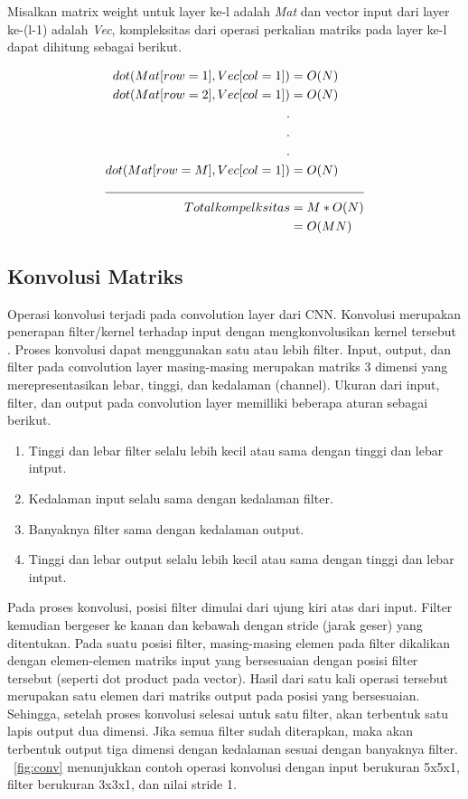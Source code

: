 Misalkan matrix weight untuk layer ke-l adalah \textit{Mat} dan vector input dari layer ke-(l-1) adalah \textit{Vec}, kompleksitas dari operasi perkalian matriks pada layer ke-l dapat dihitung sebagai berikut.

\noindent \begin{align}\label{eq:mamulcomplexity} \nonumber
	dot(Mat[row=1], Vec[col=1]) &= O(N) \\ \nonumber
	dot(Mat[row=2], Vec[col=1]) &= O(N) \\ \nonumber
	.\\ \nonumber
	.\\ \nonumber
	.\\ \nonumber
	dot(Mat[row=M], Vec[col=1]) &= O(N) \\ 
	\cline{1-2}
	\nonumber Total kompelksitas &= M*O(N) \\ 
	 &= O(MN)
\end{align} 

\subsection{Konvolusi Matriks}
Operasi konvolusi terjadi pada convolution layer dari CNN. Konvolusi merupakan penerapan filter/kernel terhadap input dengan mengkonvolusikan kernel tersebut \cite{deeplearningmatrix}. Proses konvolusi dapat menggunakan satu atau lebih filter. Input, output, dan filter pada convolution layer masing-masing merupakan matriks 3 dimensi yang merepresentasikan lebar, tinggi, dan kedalaman (channel). Ukuran dari input, filter, dan output pada convolution layer memilliki beberapa aturan sebagai berikut. 

\begin{enumerate}
\item Tinggi dan lebar filter selalu lebih kecil atau sama dengan tinggi dan lebar intput.
\item Kedalaman input selalu sama dengan kedalaman filter.
\item Banyaknya filter sama dengan kedalaman output.
\item Tinggi dan lebar output selalu lebih kecil atau sama dengan tinggi dan lebar intput.
\end{enumerate}	

Pada proses konvolusi, posisi filter dimulai dari ujung kiri atas dari input. Filter kemudian bergeser ke kanan dan kebawah dengan stride (jarak geser) yang ditentukan. Pada suatu posisi filter, masing-masing elemen pada filter dikalikan dengan elemen-elemen matriks input yang bersesuaian dengan posisi filter tersebut (seperti dot product pada vector). Hasil dari satu kali operasi tersebut merupakan satu elemen dari matriks output pada posisi yang bersesuaian.  Sehingga, setelah proses konvolusi selesai untuk satu filter, akan terbentuk satu lapis output dua dimensi. Jika semua filter sudah diterapkan, maka akan terbentuk output tiga dimensi dengan kedalaman sesuai dengan banyaknya filter. \pic~\ref{fig:conv} menunjukkan contoh operasi konvolusi dengan input berukuran 5x5x1, filter berukuran 3x3x1, dan nilai stride 1.

